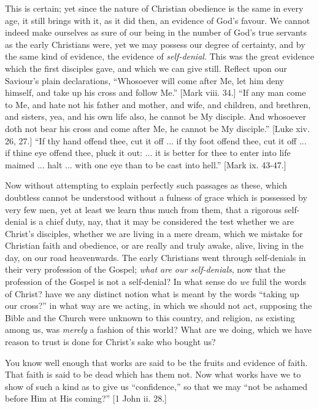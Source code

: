 This is certain; yet since the nature of Christian
obedience is the same in every age, it still brings with
it, as it did then, an evidence of God's favour. We
cannot indeed make ourselves as sure of our being in the
number of God's true servants as the early Christians
were, yet we may possess our degree of certainty, and by
the same kind of evidence, the evidence of \emph{self-denial}.
This was the great evidence which the first disciples
gave, and which we can give still. Reflect upon our
Saviour's plain declarations, ``Whosoever will come
after Me, let him deny himself, and take up his cross and
follow Me.'' [Mark viii. 34.] ``If any man come
to Me, and hate not his father and mother, and wife, and
children, and brethren, and sisters, yea, and his own
life also, he cannot be My disciple. And whosoever doth
not bear his cross and come after Me, he cannot be My
disciple.'' [Luke xiv. 26, 27.] ``If thy hand
offend thee, cut it off ... if thy foot offend thee, cut
it off ... if thine eye offend thee, pluck it out: ... it
is better for thee to enter into life maimed ... halt ...
with one eye than to be cast into hell.'' [Mark ix.
43-47.]

Now without attempting to explain perfectly such
passages as these, which doubtless cannot be understood
without a fulness of grace which is possessed by very few
men, yet at least we learn thus much from them, that a
rigorous self-denial is a chief duty, nay, that it may be
considered the test whether we are Christ's disciples,
whether we are living in a mere dream, which we mistake
for Christian faith and obedience, or are really and
truly awake, alive, living in the day, on our road
heavenwards. The early Christians went through
self-denials in their very profession of the Gospel; \emph{what
are our self-denials}, now that the profession of the
Gospel is not a self-denial? In what sense do \emph{we}
fulil the words of Christ? have we any distinct notion
what is meant by the words ``taking up our
cross?'' in what way are we acting, in which we
should not act, supposing the Bible and the Church were
unknown to this country, and religion, as existing among
us, was \emph{merely} a fashion of this world? What are
we doing, which we have reason to trust is done for
Christ's sake who bought us?

You know well enough that works are said to be the
fruits and evidence of faith. That faith is said to be
dead which has them not. Now what works have we to show
of such a kind as to give us ``confidence,'' so
that we may ``not be ashamed before Him at His
coming?'' [1 John ii. 28.]

